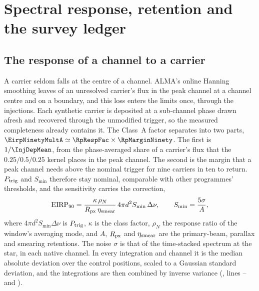 \section{Spectral response, retention and the survey ledger}
\label{app:conventions}

\subsection{The response of a channel to a carrier}

A carrier seldom falls at the centre of a channel. ALMA's online Hanning
smoothing \citep{ALMAHandbook} leaves \HanBest{} of an unresolved carrier's
flux in the peak channel at a channel centre and \HanWorst{} on a boundary,
and this loss enters the limits once, through the injections. Each synthetic
carrier is deposited at a sub-channel phase drawn afresh and recovered
through the unmodified trigger, so the measured completeness already
contains it. The Class~A factor separates into two parts,
$\EirpNinetyMultA\simeq\RpRespFac\times\RpMarginNinety$. The first is
$1/\InjDepMean$, from the phase-averaged share of a carrier's flux that the
$0.25/0.5/0.25$ kernel places in the peak channel. The second is the margin
that a peak channel needs above the nominal trigger for nine carriers in ten
to return. $P_{\rm trig}$ and $S_{\min}$ therefore stay nominal, comparable
with other programmes' thresholds, and the sensitivity carries the
correction,
\begin{equation}
\mathrm{EIRP}_{90}=\frac{\kappa\,\rho_N}{R_{\rm px}\,\eta_{\rm smear}}\,
4\pi d^{2}S_{\min}\,\Delta\nu,\qquad S_{\min}=\frac{5\sigma}{A},
\label{eq:eirp90}
\end{equation}
where $4\pi d^{2}S_{\min}\Delta\nu$ is $P_{\rm trig}$, $\kappa$ is the class
factor, $\rho_N$ the response ratio of the window's averaging mode, and $A$, $R_{\rm px}$ and $\eta_{\rm smear}$ are the
primary-beam, parallax and smearing retentions. The noise $\sigma$ is that of the
time-stacked spectrum at the star, in each native channel. In every
integration and channel it is the median absolute deviation over the control
positions, scaled to a Gaussian standard deviation, and the integrations are
then combined by inverse variance (\texttt{\LrSigFile}, lines
\LrSigLineMad--\LrSigLineSig{} and \LrSigLineComb).

